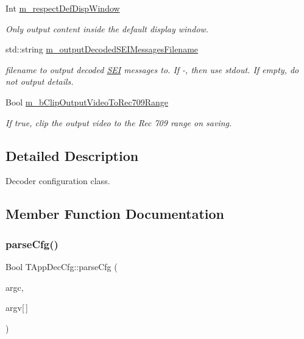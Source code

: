 \begin{DoxyCompactItemize}
\mbox{\label{class_t_app_dec_cfg_a3f9086645457585320bbdf4573e256db}} 
Int \hyperlink{class_t_app_dec_cfg_a3f9086645457585320bbdf4573e256db}{m\+\_\+respect\+Def\+Disp\+Window}
\begin{DoxyCompactList}\small\item\em Only output content inside the default display window. \end{DoxyCompactList}\item 
\mbox{\label{class_t_app_dec_cfg_acccb4938fe59bbff920dd56a4c3f2045}} 
std\+::string \hyperlink{class_t_app_dec_cfg_acccb4938fe59bbff920dd56a4c3f2045}{m\+\_\+output\+Decoded\+S\+E\+I\+Messages\+Filename}
\begin{DoxyCompactList}\small\item\em filename to output decoded \hyperlink{class_s_e_i}{S\+EI} messages to. If \textquotesingle{}-\/\textquotesingle{}, then use stdout. If empty, do not output details. \end{DoxyCompactList}\item 
\mbox{\label{class_t_app_dec_cfg_ab90b455b765ae85dca5ad192d9f2b573}} 
Bool \hyperlink{class_t_app_dec_cfg_ab90b455b765ae85dca5ad192d9f2b573}{m\+\_\+b\+Clip\+Output\+Video\+To\+Rec709\+Range}
\begin{DoxyCompactList}\small\item\em If true, clip the output video to the Rec 709 range on saving. \end{DoxyCompactList}\end{DoxyCompactItemize}


\subsection{Detailed Description}
Decoder configuration class. 

\subsection{Member Function Documentation}
\mbox{\label{class_t_app_dec_cfg_a838166e6f987ee444b97f9f244770132}} 
\subsubsection{\texorpdfstring{parse\+Cfg()}{parseCfg()}}
{\footnotesize\ttfamily Bool T\+App\+Dec\+Cfg\+::parse\+Cfg (\begin{DoxyParamCaption}\item[{Int}]{argc,  }\item[{T\+Char $\ast$}]{argv\mbox{[}$\,$\mbox{]} }\end{DoxyParamCaption})}



